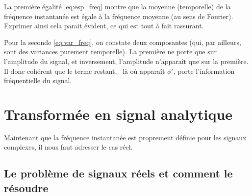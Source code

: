 La première égalité \eqref{eq:esp_freq} montre que la moyenne (temporelle) de la fréquence instantanée est égale à la fréquence moyenne (au sens de Fourier). Exprimer ainsi cela parait évident, ce qui est tout à fait rassurant.

Pour la seconde \eqref{eq:var_freq}, on constate deux composantes (qui, par ailleurs, sont des variances purement temporelle). La première ne porte que sur l'amplitude du signal, et inversement, l'amplitude n'apparaît que sur la première. Il donc cohérent que le terme restant, \ie~là où apparaît $\phi'$, porte l'information fréquentielle du signal.
\\



\section{Transformée en signal analytique}

Maintenant que la fréquence instantanée est proprement définie pour les signaux complexes, il nous faut adresser le cas réel.
\\

\subsection{Le problème de signaux réels et comment le résoudre}\label{sec:transfo_SA}

